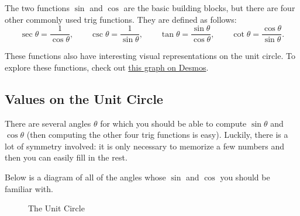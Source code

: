 \documentclass{article}
\theoremstyle{definition}
\theoremstyle{definition}
\begin{document}
The two functions $\sin$ and $\cos$ are the basic building blocks, but there are four other commonly used trig functions. They are defined as follows:
$$\sec \theta = \frac{1}{\cos\theta}, \quad \quad \csc\theta=\frac{1}{\sin\theta}, \quad \quad \tan\theta=\frac{\sin\theta}{\cos\theta}, \quad \quad \cot\theta=\frac{\cos\theta}{\sin\theta}.$$

These functions also have interesting visual representations on the unit circle. To explore these functions, check out \href{https://www.desmos.com/calculator/fdr54f2jh3}{this graph on Desmos}.


\subsection{Values on the Unit Circle}

There are several angles $\theta$ for which you should be able to compute $\sin\theta$ and $\cos\theta$ (then computing the other four trig functions is easy). Luckily, there is a lot of symmetry involved: it is only necessary to memorize a few numbers and then you can easily fill in the rest.

Below is a diagram of all of the angles whose $\sin$ and $\cos$ you should be familiar with.

\vspace{1em}

\begin{figure}[h!]
\label{the-unit-circle}
\centering
{}
\caption{The Unit Circle}
\end{figure}

\vspace{1em}
\end{document}
